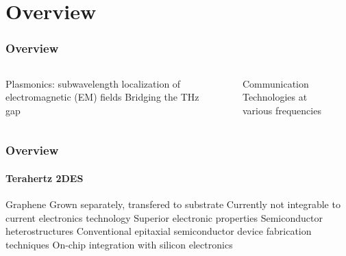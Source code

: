\documentclass[mathserif,16pt,xcolor=table]{beamer}
\begin{document}
\section{Overview}
\begin{frame}
  \frametitle{Overview}
  \begin{columns} %
    \begin{column}{.5\textwidth} \vspace*{-1cm}
      \begin{outline}[itemize]
        \1 Plasmonics: subwavelength localization of electromagnetic (EM) fields
        \1 Bridging the THz gap
      \end{outline}
    \end{column}
    \begin{column}{.5\textwidth}
      \begin{figure}
        \centering \hspace*{-0.75cm}
        \fontsize{6}{7}\selectfont
        \def\svgwidth{1.1\linewidth}
        
        \label{fig:spp_2deg}
        \caption{Communication Technologies at various frequencies}
      \end{figure}
      \end{column}%
    \end{columns}
  \end{frame}
  \begin{frame}
    \frametitle{Overview}
    \framesubtitle{Terahertz 2DES}
    \begin{outline}[itemize]
      \1 Graphene
      \2 Grown separately, transfered to substrate
      \2 Currently not integrable to current electronics technology
      \2 Superior electronic properties
      \1 Semiconductor heterostructures
      \2 Conventional epitaxial semiconductor device fabrication techniques
      \2 On-chip integration with silicon electronics
    \end{outline}
  \end{frame}
\end{document}
